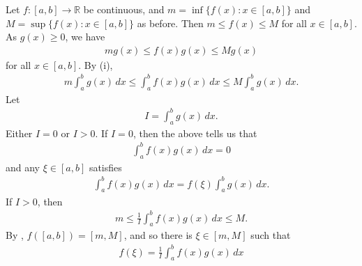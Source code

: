 \documentclass[letterpaper,10pt,english]{jupyterBook}
\begin{document}
\sphinxAtStartPar
{\hyperref[\detokenize{Problems:id77}]{}} Let \(f:[a,b]\to\mathbb{R}\) be continuous, and  \(m = \inf \{ f(x) : x\in [a,b] \}\) and \(M = \sup \{ f(x) : x\in [a,b] \}\) as before. Then \(m\leq f(x)\leq M\) for all \(x\in [a,b]\). As \(g(x)\geq 0\), we have
\begin{equation*}
\begin{split}
mg(x)\leq f(x)g(x)\leq Mg(x)
\end{split}
\end{equation*}
\sphinxAtStartPar
for all \(x\in [a,b]\). By (i),
\begin{equation*}
\begin{split}
m \int_a^b g(x)\, dx \leq \int_a^b f(x)g(x)\, dx \leq M\int_a^b g(x)\, dx.
\end{split}
\end{equation*}
\sphinxAtStartPar
Let
\begin{equation*}
\begin{split}
I= \int_a^b g(x)\, dx.
\end{split}
\end{equation*}
\sphinxAtStartPar
Either \(I=0\) or \(I>0\). If \(I=0\), then the above tells us that
\begin{equation*}
\begin{split}
\int_a^b f(x)g(x)\, dx =0
\end{split}
\end{equation*}
\sphinxAtStartPar
and any \(\xi \in [a,b]\) satisfies
\begin{equation*}
\begin{split}
\int_a^b f(x)g(x)\, dx = f(\xi ) \int_a^b g(x)\, dx .
\end{split}
\end{equation*}
\sphinxAtStartPar
If \(I>0\), then
\begin{equation*}
\begin{split}
m \leq \frac{1}{I} \int_a^b f(x)g(x)\, dx \leq M.
\end{split}
\end{equation*}
\sphinxAtStartPar
By , \(f([a,b])=[m,M]\), and so there is \(\xi \in [m,M]\) such that
\begin{equation*}
\begin{split}
f(\xi ) = \frac{1}{I}  \int_a^b f(x)g(x)\, dx
\end{split}
\end{equation*}
\end{document}
